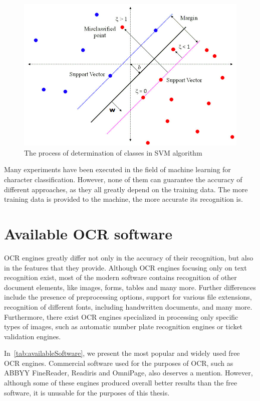 \begin{figure}[t]
\centering
\includegraphics[width=0.7\linewidth]{img/characterClassification/svm.jpg}
\caption{The process of determination of classes in SVM algorithm~\citep{svmAlgorithm}}
\label{fig:characterClassSVM}
\end{figure}

Many experiments have been executed in the field of machine learning for character classification. However, none of them can guarantee the accuracy of different approaches, as they all greatly depend on the training data. The more training data is provided to the machine, the more accurate its recognition is. 

\section{Available OCR software}

OCR engines greatly differ not only in the accuracy of their recognition, but also in the features that they provide. Although OCR engines focusing only on text recognition exist, most of the modern software contains recognition of other document elements, like images, forms, tables and many more. Further differences include the presence of preprocessing options, support for various file extensions, recognition of different fonts, including handwritten documents, and many more. Furthermore, there exist OCR engines specialized in processing only specific types of images, such as automatic number plate recognition engines or ticket validation engines.

In~\cref{tab:availableSoftware}, we present the most popular and widely used free OCR engines. Commercial software used for the purposes of OCR, such as ABBYY FineReader, Readiris and OmniPage, also deserves a mention. However, although some of these engines produced overall better results than the free software, it is unusable for the purposes of this thesis.

